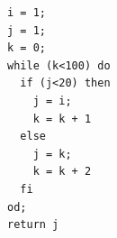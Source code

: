 \documentclass{jarticle}
\begin{document}
\begin{Verbatim}
i = 1;
j = 1;
k = 0;
while (k<100) do
  if (j<20) then
    j = i;
    k = k + 1
  else
    j = k;
    k = k + 2
  fi
od;
return j
\end{Verbatim}
\end{document}

